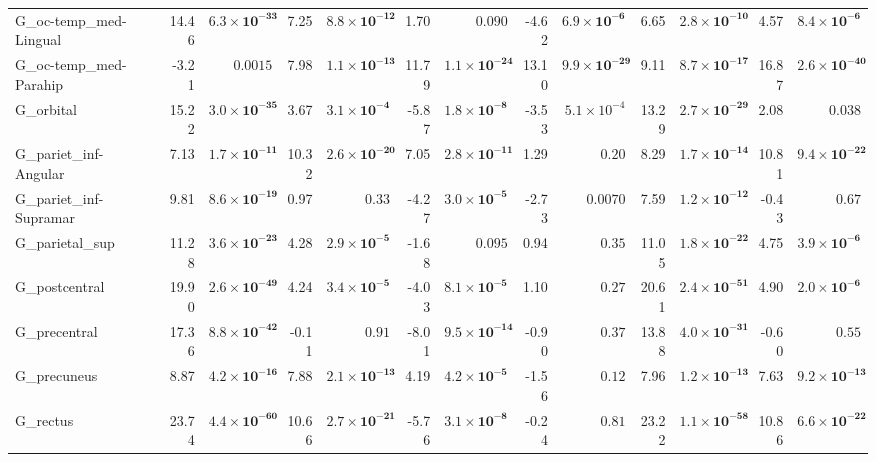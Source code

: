 {\begin{longtable}{llrrrrrrrrrrrr}
G\_oc-temp\_med-Lingual &  & 14.46 & $\mathbf{6.3{\times}10^{-33}}$ & 7.25 & $\mathbf{8.8{\times}10^{-12}}$ & 1.70 & $0.090$ & -4.62 & $\mathbf{6.9{\times}10^{-6}}$ & 6.65 & $\mathbf{2.8{\times}10^{-10}}$ & 4.57 & $\mathbf{8.4{\times}10^{-6}}$ \\
G\_oc-temp\_med-Parahip &  & -3.21 & $0.0015$ & 7.98 & $\mathbf{1.1{\times}10^{-13}}$ & 11.79 & $\mathbf{1.1{\times}10^{-24}}$ & 13.10 & $\mathbf{9.9{\times}10^{-29}}$ & 9.11 & $\mathbf{8.7{\times}10^{-17}}$ & 16.87 & $\mathbf{2.6{\times}10^{-40}}$ \\
G\_orbital &  & 15.22 & $\mathbf{3.0{\times}10^{-35}}$ & 3.67 & $\mathbf{3.1{\times}10^{-4}}$ & -5.87 & $\mathbf{1.8{\times}10^{-8}}$ & -3.53 & $5.1{\times}10^{-4}$ & 13.29 & $\mathbf{2.7{\times}10^{-29}}$ & 2.08 & $0.038$ \\
G\_pariet\_inf-Angular &  & 7.13 & $\mathbf{1.7{\times}10^{-11}}$ & 10.32 & $\mathbf{2.6{\times}10^{-20}}$ & 7.05 & $\mathbf{2.8{\times}10^{-11}}$ & 1.29 & $0.20$ & 8.29 & $\mathbf{1.7{\times}10^{-14}}$ & 10.81 & $\mathbf{9.4{\times}10^{-22}}$ \\
G\_pariet\_inf-Supramar &  & 9.81 & $\mathbf{8.6{\times}10^{-19}}$ & 0.97 & $0.33$ & -4.27 & $\mathbf{3.0{\times}10^{-5}}$ & -2.73 & $0.0070$ & 7.59 & $\mathbf{1.2{\times}10^{-12}}$ & -0.43 & $0.67$ \\
G\_parietal\_sup &  & 11.28 & $\mathbf{3.6{\times}10^{-23}}$ & 4.28 & $\mathbf{2.9{\times}10^{-5}}$ & -1.68 & $0.095$ & 0.94 & $0.35$ & 11.05 & $\mathbf{1.8{\times}10^{-22}}$ & 4.75 & $\mathbf{3.9{\times}10^{-6}}$ \\
G\_postcentral &  & 19.90 & $\mathbf{2.6{\times}10^{-49}}$ & 4.24 & $\mathbf{3.4{\times}10^{-5}}$ & -4.03 & $\mathbf{8.1{\times}10^{-5}}$ & 1.10 & $0.27$ & 20.61 & $\mathbf{2.4{\times}10^{-51}}$ & 4.90 & $\mathbf{2.0{\times}10^{-6}}$ \\
G\_precentral &  & 17.36 & $\mathbf{8.8{\times}10^{-42}}$ & -0.11 & $0.91$ & -8.01 & $\mathbf{9.5{\times}10^{-14}}$ & -0.90 & $0.37$ & 13.88 & $\mathbf{4.0{\times}10^{-31}}$ & -0.60 & $0.55$ \\
G\_precuneus &  & 8.87 & $\mathbf{4.2{\times}10^{-16}}$ & 7.88 & $\mathbf{2.1{\times}10^{-13}}$ & 4.19 & $\mathbf{4.2{\times}10^{-5}}$ & -1.56 & $0.12$ & 7.96 & $\mathbf{1.2{\times}10^{-13}}$ & 7.63 & $\mathbf{9.2{\times}10^{-13}}$ \\
G\_rectus &  & 23.74 & $\mathbf{4.4{\times}10^{-60}}$ & 10.66 & $\mathbf{2.7{\times}10^{-21}}$ & -5.76 & $\mathbf{3.1{\times}10^{-8}}$ & -0.24 & $0.81$ & 23.22 & $\mathbf{1.1{\times}10^{-58}}$ & 10.86 & $\mathbf{6.6{\times}10^{-22}}$ \\

\end{longtable}}
